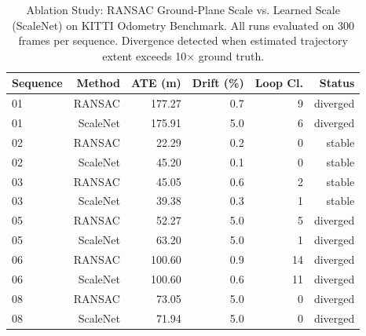 \begin{table}[h]
\centering
\caption{Ablation Study: RANSAC Ground-Plane Scale vs. Learned Scale (ScaleNet) on KITTI Odometry Benchmark. All runs evaluated on 300 frames per sequence. Divergence detected when estimated trajectory extent exceeds 10× ground truth.}
\label{tab:ablation}
\begin{tabular}{lrrrrr}
\hline
\textbf{Sequence} & \textbf{Method} & \textbf{ATE (m)} & \textbf{Drift (\%)} & \textbf{Loop Cl.} & \textbf{Status} \\
\hline
01 & RANSAC & 177.27 & 0.7 & 9 & diverged \\
01 & ScaleNet & 175.91 & 5.0 & 6 & diverged \\
02 & RANSAC & 22.29 & 0.2 & 0 & stable \\
02 & ScaleNet & 45.20 & 0.1 & 0 & stable \\
03 & RANSAC & 45.05 & 0.6 & 2 & stable \\
03 & ScaleNet & 39.38 & 0.3 & 1 & stable \\
05 & RANSAC & 52.27 & 5.0 & 5 & diverged \\
05 & ScaleNet & 63.20 & 5.0 & 1 & diverged \\
06 & RANSAC & 100.60 & 0.9 & 14 & diverged \\
06 & ScaleNet & 100.60 & 0.6 & 11 & diverged \\
08 & RANSAC & 73.05 & 5.0 & 0 & diverged \\
08 & ScaleNet & 71.94 & 5.0 & 0 & diverged \\
\hline
\end{tabular}
\end{table}
